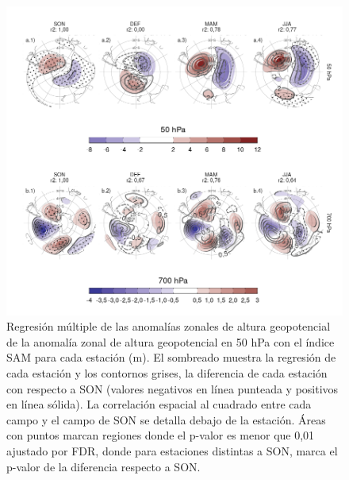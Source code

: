 \documentclass[12pt,oneside,a4paper]{reedthesis}
\begin{document}
\begin{figure}

{\centering \includegraphics{figures/30-sam/season-regression-1} 

}

\caption{Regresión múltiple de las anomalías zonales de altura geopotencial de la anomalía zonal de altura geopotencial en 50 hPa con el índice SAM para cada estación (m). El sombreado muestra la regresión de cada estación y los contornos grises, la diferencia de cada estación con respecto a SON (valores negativos en línea punteada y positivos en línea sólida). La correlación espacial al cuadrado entre cada campo y el campo de SON se detalla debajo de la estación. Áreas con puntos marcan regiones donde el p-valor es menor que 0,01 ajustado por FDR, donde para estaciones distintas a SON, marca el p-valor de la diferencia respecto a SON.}\label{fig:season-regression}
\end{figure}
\end{document}
